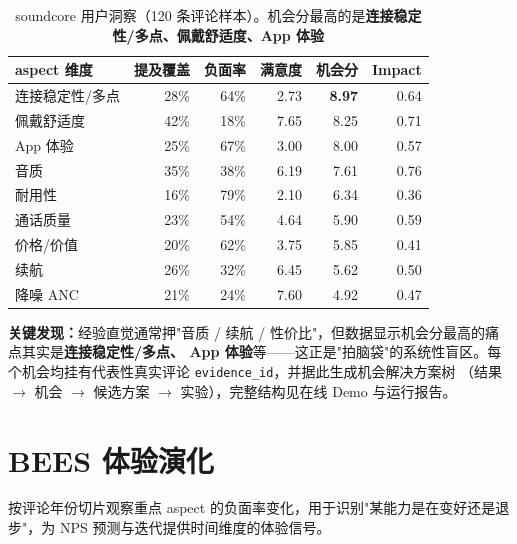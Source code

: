 \begin{table}[h]\centering\small
\renewcommand{\arraystretch}{1.2}
\begin{tabularx}{\linewidth}{X r r r r r}
\toprule
\textbf{aspect 维度} & \textbf{提及覆盖} & \textbf{负面率} & \textbf{满意度} & \textbf{机会分} & \textbf{Impact} \\
\midrule
连接稳定性/多点 & 28\% & 64\% & 2.73 & \textbf{8.97} & 0.64 \\
佩戴舒适度 & 42\% & 18\% & 7.65 & 8.25 & 0.71 \\
App 体验 & 25\% & 67\% & 3.00 & 8.00 & 0.57 \\
音质 & 35\% & 38\% & 6.19 & 7.61 & 0.76 \\
耐用性 & 16\% & 79\% & 2.10 & 6.34 & 0.36 \\
通话质量 & 23\% & 54\% & 4.64 & 5.90 & 0.59 \\
价格/价值 & 20\% & 62\% & 3.75 & 5.85 & 0.41 \\
续航 & 26\% & 32\% & 6.45 & 5.62 & 0.50 \\
降噪 ANC & 21\% & 24\% & 7.60 & 4.92 & 0.47 \\
\bottomrule
\end{tabularx}
\caption{soundcore 用户洞察（120 条评论样本）。机会分最高的是\textbf{连接稳定性/多点、佩戴舒适度、App 体验}}
\end{table}

\noindent\textbf{关键发现：}经验直觉通常押"音质 / 续航 / 性价比"，但数据显示机会分最高的痛点其实是\textbf{连接稳定性/多点、
App 体验}等——这正是"拍脑袋"的系统性盲区。每个机会均挂有代表性真实评论 \texttt{evidence\_id}，并据此生成机会解决方案树
（结果 $\rightarrow$ 机会 $\rightarrow$ 候选方案 $\rightarrow$ 实验），完整结构见在线 Demo 与运行报告。

\section{BEES 体验演化}
按评论年份切片观察重点 aspect 的负面率变化，用于识别"某能力是在变好还是退步"，为 NPS 预测与迭代提供时间维度的体验信号。
